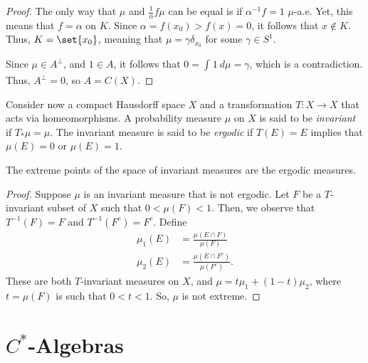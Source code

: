 \documentclass[10pt]{mypackage}
\begin{document}
\begin{proof}
  The only way that $\mu$ and $\frac{1}{\alpha}f\mu$ can be equal is if $\alpha^{-1}f = 1$ $\mu$-a.e. Yet, this means that $f = \alpha$ on $K$. Since $\alpha = f\left( x_0 \right) > f\left( x \right) = 0$, it follows that $x\notin K$. Thus, $K = \set{x_0}$, meaning that $\mu = \gamma \delta_{x_0}$ for some $\gamma\in S^1$.

  Since $\mu\in A^{\perp}$, and $1\in A$, it follows that $0 = \int_{}^{} 1\:d\mu = \gamma$, which is a contradiction. Thus, $A^{\perp} = 0$, so $A = C(X)$.
\end{proof}
Consider now a compact Hausdorff space $X$ and a transformation $T\colon X\to X$ that acts via homeomorphisms. A probability measure $\mu$ on $X$ is said to be \textit{invariant} if $T_{\ast}\mu = \mu$. The invariant measure is said to be \textit{ergodic} if $T(E) = E$ implies that $\mu(E) = 0$ or $\mu(E) = 1$.
\begin{proposition}
  The extreme points of the space of invariant measures are the ergodic measures.
\end{proposition}
\begin{proof}
  Suppose $\mu$ is an invariant measure that is not ergodic. Let $F$ be a $T$-invariant subset of $X$ such that $0 < \mu(F) < 1$. Then, we observe that $T^{-1}(F) = F$ and $T^{-1}\left( F^{c} \right) = F^{c}$. Define
  \begin{align*}
    \mu_1(E) &= \frac{\mu\left( E\cap F \right)}{\mu\left( F \right)}\\
    \mu_2(E) &= \frac{\mu\left( E\cap F^{c} \right)}{\mu\left( F^{c} \right)}.
  \end{align*}
  These are both $T$-invariant measures on $X$, and $\mu = t\mu_1 + \left( 1-t \right)\mu_2$, where $t = \mu(F)$ is such that $0 < t < 1$. So, $\mu$ is not extreme.
\end{proof}
\section{$C^{\ast}$-Algebras}%
\end{document}
